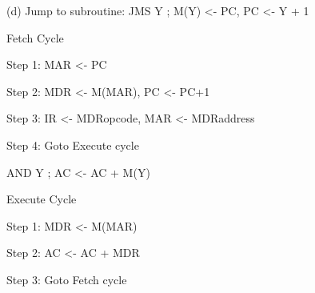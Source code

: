 \documentclass[10pt]{article}
\begin{document}
\begin{multicols}{2}
(d) Jump to subroutine: JMS Y ; M(Y) <- PC, PC <- Y + 1

Fetch Cycle

Step 1: MAR <- PC

Step 2: MDR <- M(MAR), PC <- PC+1

Step 3: IR <- MDRopcode, MAR <- MDRaddress

Step 4: Goto Execute cycle

AND Y ; AC <- AC + M(Y)

Execute Cycle

Step 1: MDR <- M(MAR)

Step 2: AC <- AC + MDR

Step 3: Goto Fetch cycle




\end{multicols}
\end{document}
